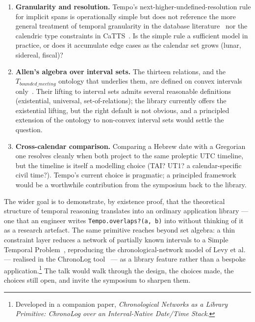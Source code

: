 \begin{enumerate}
  \item \textbf{Granularity and resolution.} Tempo's
    next-higher-undefined-resolution rule for implicit spans is
    operationally simple but does not reference the more general
    treatment of temporal granularity in the database
    literature~\cite{bettini-granularities} nor the calendric type
    constraints in CaTTS~\cite{bry-spranger-multicalendar}. Is the
    simple rule a sufficient model in practice, or does it accumulate
    edge cases as the calendar set grows (lunar, sidereal, fiscal)?

  \item \textbf{Allen's algebra over interval sets.} The thirteen
    relations, and the $T_{bounded\_meeting}$ ontology that
    underlies them, are defined on convex intervals
    only~\cite{gruninger2017allenontology}. Their lifting to interval
    sets admits several reasonable definitions
    (existential, universal, set-of-relations); the library currently
    offers the existential lifting, but the right default is not
    obvious, and a principled extension of the ontology to non-convex
    interval sets would settle the question.

  \item \textbf{Cross-calendar comparison.} Comparing a Hebrew date
    with a Gregorian one resolves cleanly when both project to the
    same proleptic UTC timeline, but the timeline is itself a
    modelling choice (TAI? UT1? a calendar-specific civil time?).
    Tempo's current choice is pragmatic; a principled framework would
    be a worthwhile contribution from the symposium back to the
    library.
\end{enumerate}

The wider goal is to demonstrate, by existence proof, that the
theoretical structure of temporal reasoning translates into an
ordinary application library --- one that an engineer writes
\texttt{Tempo.overlaps?(a, b)} into without thinking of it as a
research artefact. The same primitive reaches beyond set algebra: a
thin constraint layer reduces a network of partially known intervals to
a Simple Temporal Problem~\cite{dechter1991}, reproducing the
chronological-network model of Levy et al.~\cite{levy2020} --- realised
in the ChronoLog tool~\cite{chronolog} --- as a library feature rather
than a bespoke application.\footnote{Developed in a companion paper,
  \emph{Chronological Networks as a Library Primitive: ChronoLog over an
  Interval-Native Date/Time Stack}.} The talk would walk through the
design, the choices made, the choices still open, and invite the
symposium to sharpen them.

